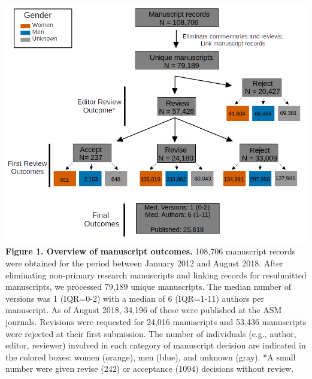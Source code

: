 \documentclass[11pt,]{article}
\begin{document}
\includegraphics{population_diagram.png} \textbf{Figure 1. Overview of
manuscript outcomes.} 108,706 manuscript records were obtained for the
period between January 2012 and August 2018. After eliminating
non-primary research manuscripts and linking records for resubmitted
manuscripts, we processed 79,189 unique manuscripts. The median number
of versions was 1 (IQR=0-2) with a median of 6 (IQR=1-11) authors per
manuscript. As of August 2018, 34,196 of these were published at the ASM
journals. Revisions were requested for 24,016 manuscripts and 53,436
manuscripts were rejected at their first submission. The number of
individuals (e.g., author, editor, reviewer) involved in each category
of manuscript decision are indicated in the colored boxes: women
(orange), men (blue), and unknown (gray). *A small number were given
revise (242) or acceptance (1094) decisions without review.

\newpage
\end{document}
